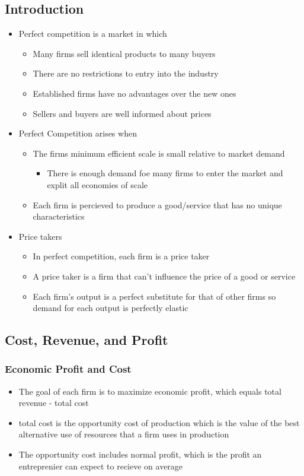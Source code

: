\documentclass[11pt]{article}
\begin{document}
\subsection{Introduction}
\label{sec:org68a0bf0}
\begin{itemize}
\item Perfect competition is a market in which
\begin{itemize}
\item Many firms sell identical products to many buyers
\item There are no restrictions to entry into the industry
\item Established firms have no advantages over the new ones
\item Sellers and buyers are well informed about prices
\end{itemize}
\item Perfect Competition arises when
\begin{itemize}
\item The firms minimum efficient scale is small relative to market demand
\begin{itemize}
\item There is enough demand foe many firms to enter the market and explit all economies of scale
\end{itemize}
\item Each firm is percieved to produce a good/service that has no unique characteristics
\end{itemize}
\item Price takers
\begin{itemize}
\item In perfect competition, each firm is a price taker
\item A price taker is a firm that can't influence the price of a good or service
\item Each firm's output is a perfect substitute for that of other firms so demand for each output is perfectly elastic
\end{itemize}
\end{itemize}
\subsection{Cost, Revenue, and Profit}
\label{sec:org70bae7d}
\subsubsection{Economic Profit and Cost}
\label{sec:org87fc40f}
\begin{itemize}
\item The goal of each firm is to maximize economic profit, which equals total revenue - total cost
\item total cost is the opportunity cost of production which is the value of the best alternative use of resources that a firm uses in production
\item The opportunity cost includes normal profit, which is the profit an entreprenier can expect to recieve on average
\end{itemize}
\end{document}
